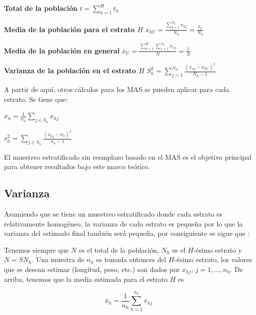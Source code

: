 \documentclass{report}
\begin{document}
\bigbreak

\textbf{Total de la población}
\bigbreak
$t = \sum \limits_{h=1}^H t_h$


\bigbreak

\textbf{Media de la población para el estrato $H$}
\bigbreak
$\overline{x}_{hU} = \frac{\sum \limits_{j=1}^{N_h} x_{hj}}{N_h} = \frac{t_h}{N_h}$


\bigbreak

\textbf{Media de la población en general}
\bigbreak
$\overline{x}_U = \frac{\sum \limits_{h=1}^H \sum \limits_{j=1}^{N_h} x_{hj}}{N} = \frac{t}{N}$


\bigbreak

\textbf{Varianza de la población en el estrato $H$}
\bigbreak
$S_h^2 = \sum \limits_{j=1}^{N_h} \frac{(x_{hj} - \overline{x}_{hU})^2}{N_h - 1}$


\bigbreak

A partir de aquí, otros cálculos para los MAS se pueden aplicar para cada estrato. Se tiene que:

\bigbreak

$\overline{x}_h = \frac{1}{n_h} \sum \limits_{j \in S_h} x_{hj}$

\bigbreak

$s^2_h = \sum \limits_{j \in S_h} \frac{(x_{hj} - \overline{x}_h)^2}{n_h - 1}$

\bigbreak

El muestreo estratificado sin reemplazo basado en el MAS es el objetivo principal para obtener resultados bajo este marco teórico.

\subsection{Varianza}

Asumiendo que se tiene un muestreo estratificado donde cada estrato es relativamente homogéneo, la varianza de cada estrato es pequeña por lo que la varianza del estimado final también será pequeña, por consiguiente se sigue que \cite{gulland-1966}:

\bigbreak

Tenemos siempre que $N$ es el total de la población, $N_h$ es el $H$-ésimo estrato y $N=SN_h$. Una muestra de $n_h$ es tomada entonces del $H$-ésimo estrato, los valores que se desean estimar (longitud, peso, etc.) son dados por $x_{hj}$, $j=1,...,n_h$. De arriba, tenemos que la media estimada para el estrato $H$ es

$$
\overline{x}_h = \frac{1}{n_h} \sum \limits_{h=1}^{n_h} x_{hj}
$$
\end{document}
